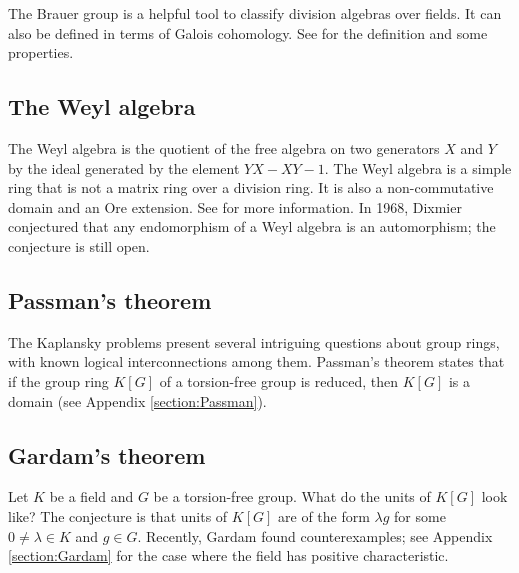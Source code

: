 The Brauer group is a helpful tool to classify division algebras over fields. It can also be defined in terms of Galois cohomology. 
See \cite{MR1233388} for the definition and some properties. 

\subsection*{The Weyl algebra}

The Weyl algebra is the quotient of the free algebra on two generators
$X$ and $Y$ by the ideal generated by the element
$YX-XY-1$. The Weyl algebra is a simple ring that is 
not a matrix ring over a division ring. It is also a non-commutative domain and an Ore extension. See \cite{MR1838439} for more information. 
In 1968, Dixmier conjectured that any 
endomorphism of a Weyl algebra is an automorphism; the conjecture
is still open. 

\subsection*{Passman's theorem}

The Kaplansky problems present several intriguing questions about group rings, with known logical interconnections among them. Passman's theorem states that if the group ring $K[G]$ of a torsion-free group
is reduced, then $K[G]$ is a domain (see Appendix \ref{section:Passman}).

\subsection*{Gardam's theorem}

Let $K$ be a field and $G$ be a torsion-free group. 
What do the units of $K[G]$ look like? The conjecture
is that units of $K[G]$ are of the form $\lambda g$ for
some $0\ne\lambda\in K$ and $g\in G$. Recently, 
Gardam \cite{MR4334981} found counterexamples; see Appendix \ref{section:Gardam} for the case where the field has positive characteristic. 





% 

